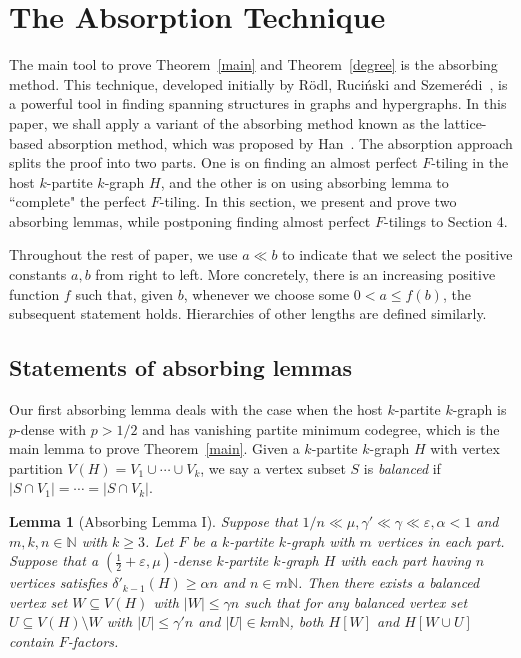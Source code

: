 \documentclass[11pt,a4paper]{article}
\newtheorem{lemma}[thm]{Lemma}
\theoremstyle{definition}
\begin{document}
\section{The Absorption Technique}

The main tool to prove Theorem~\ref{main} and Theorem~\ref{degree} is the absorbing method. This technique, developed initially by R\"odl, Ruci\'nski and Szemer\'edi~\cite{RRSa}, is a powerful tool in finding spanning structures in graphs and hypergraphs. In this paper, we shall apply a variant of the absorbing method known as the lattice-based absorption method, which was proposed by Han~\cite{Han}. The absorption approach splits the proof into two parts. One is on finding an almost perfect $F$-tiling in the host $k$-partite $k$-graph $H$, and the other is on using absorbing lemma to ``complete" the perfect $F$-tiling. In this section, we present and prove two absorbing lemmas, while postponing finding almost perfect $F$-tilings to Section 4.


Throughout the rest of paper, we use $a\ll b$ to indicate that we select the positive constants  $a, b$ from right to left. More concretely, there is an increasing positive function
$f$ such that, given $b$, whenever we choose some $0<a\le  f(b)$, the subsequent statement holds. Hierarchies of other lengths are defined similarly. 

\subsection{Statements of absorbing lemmas}
Our first absorbing lemma deals with the case when the host $k$-partite $k$-graph is $p$-dense with $p>1/2$ and has vanishing partite minimum codegree, which is the main lemma to prove Theorem~\ref{main}. Given a $k$-partite $k$-graph $H$ with vertex partition $V(H)=V_1\cup \cdots \cup V_k$, we say a vertex subset $S$ is {\emph {balanced}} if $|S\cap V_1|=\cdots=|S\cap V_k|$.



\begin{lemma}[Absorbing Lemma I]\label{Abs1}
Suppose that $1/n\ll \mu, \gamma'\ll \gamma \ll  \varepsilon,\alpha <1$ and $m,k, n \in \mathbb{N}$ with $k\ge 3$.
Let $F$ be a $k$-partite $k$-graph with $m$ vertices in each part. Suppose that a $(\frac{1}{2}+\varepsilon, \mu)$-dense $k$-partite $k$-graph $H$ with each part having $n$ vertices satisfies $\delta'_{k-1}(H)\geq \alpha n$ and $n\in m\mathbb{N}$.
Then there exists a balanced vertex set $W \subseteq V (H)$ with $|W| \leq \gamma n$ such that for any balanced vertex set $U\subseteq V(H)\setminus W$ with $|U|\leq \gamma' n$ and $|U|\in km\mathbb{N}$, both $H[W]$ and $H[W \cup U]$ contain $F$-factors.
\end{lemma}
\end{document}
